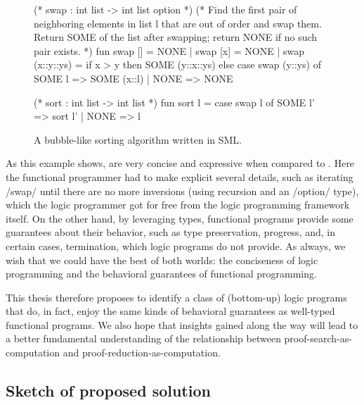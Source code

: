 \begin{figure}
  \begin{pyglist}[language=sml, gobble=2]
  (* swap : int list -> int list option *)
  (* Find the first pair of neighboring elements
     in list l that are out of order and swap them.
     Return SOME of the list after swapping;
     return NONE if no such pair exists. *)
  fun swap [] = NONE
    | swap [x] = NONE
    | swap (x::y::ys) =
        if x > y
        then
          SOME (y::x::ys)
        else
          case swap (y::ys) of
            SOME l => SOME (x::l)
          | NONE => NONE

  (* sort : int list -> int list *)
  fun sort l =
        case swap l of
          SOME l' => sort l'
        | NONE => l
  \end{pyglist}
  \caption{A bubble-like sorting algorithm written in \acl{SML}.\label{fig:bubble-sml}}
\end{figure}

As this example shows,  are very concise and expressive when compared to .
Here the functional programmer had to make explicit several details, such as iterating \sml/swap/ until there are no more inversions (using recursion and an \sml/option/ type), which the logic programmer got for free from the logic programming framework itself.
On the other hand, by leveraging types, functional programs provide some guarantees about their behavior, such as type preservation, progress, and, in certain cases, termination, which logic programs do not provide.
As always, we wish that we could have the best of both worlds: the conciseness of logic programming and the behavioral guarantees of functional programming.

This thesis therefore proposes to identify a class of (bottom-up) logic programs that do, in fact, enjoy the same kinds of behavioral guarantees as well-typed functional programs.
We also hope that insights gained along the way will lead to a better fundamental understanding of the relationship between proof-search-as-computation and proof-reduction-as-computation.

\subsection{Sketch of proposed solution}\label{sec:sketch-solution}


